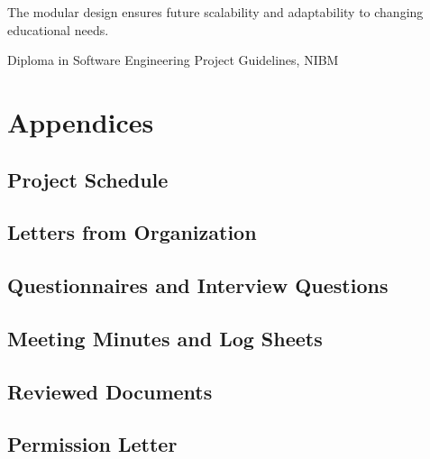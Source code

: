\documentclass[12pt,a4paper]{report}
\begin{document}
The modular design ensures future scalability and adaptability to changing educational needs.

\newpage
\begin{thebibliography}{9}
     Diploma in Software Engineering Project Guidelines, NIBM
\end{thebibliography}

\appendix
\chapter{Appendices}
\section{Project Schedule}

\section{Letters from Organization}

\section{Questionnaires and Interview Questions}

\section{Meeting Minutes and Log Sheets}

\section{Reviewed Documents}

\section{Permission Letter}
\end{document}
